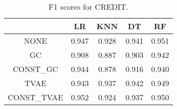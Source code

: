 \begin{table}
\caption{F1 scores for CREDIT.}
\label{tab:f1-CREDIT}
\begin{tabular}{ccccc}
\toprule
 & LR & KNN & DT & RF \\
\midrule
NONE & 0.947 & 0.928 & 0.941 & 0.951 \\
GC & 0.908 & 0.887 & 0.903 & 0.942 \\
CONST\_GC & 0.944 & 0.878 & 0.916 & 0.940 \\
TVAE & 0.943 & 0.937 & 0.942 & 0.949 \\
CONST\_TVAE & 0.952 & 0.924 & 0.937 & 0.950 \\
\bottomrule
\end{tabular}
\end{table}
